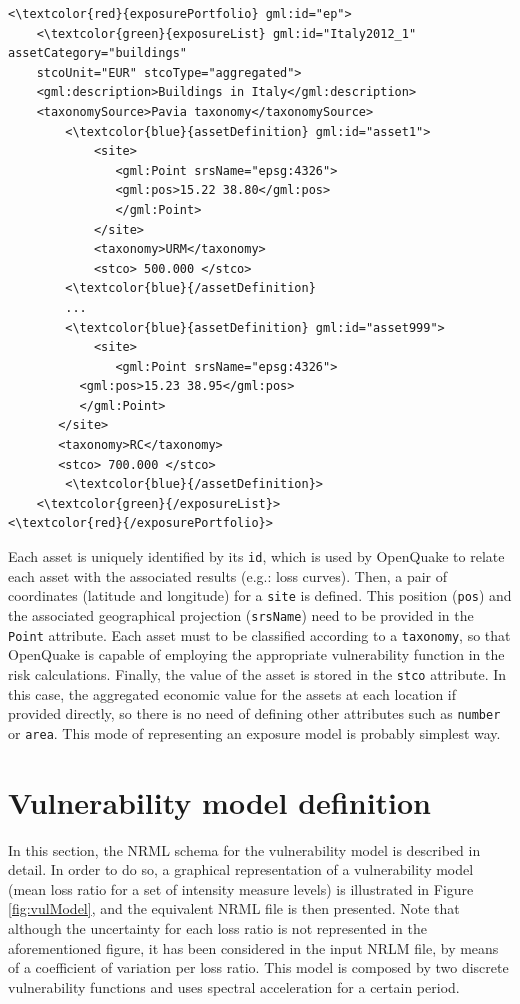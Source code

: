 \begin{Verbatim}[frame=single, commandchars=\\\{\}, samepage=false]
<\textcolor{red}{exposurePortfolio} gml:id="ep">
    <\textcolor{green}{exposureList} gml:id="Italy2012_1" assetCategory="buildings" 
    stcoUnit="EUR" stcoType="aggregated">
    <gml:description>Buildings in Italy</gml:description>
    <taxonomySource>Pavia taxonomy</taxonomySource>
        <\textcolor{blue}{assetDefinition} gml:id="asset1">
            <site>
               <gml:Point srsName="epsg:4326">
               <gml:pos>15.22 38.80</gml:pos>
               </gml:Point>
            </site>
            <taxonomy>URM</taxonomy>
            <stco> 500.000 </stco>
        <\textcolor{blue}{/assetDefinition} 
        ...
        <\textcolor{blue}{assetDefinition} gml:id="asset999">
            <site>
               <gml:Point srsName="epsg:4326">
	      <gml:pos>15.23 38.95</gml:pos>
	      </gml:Point>
	   </site>
	   <taxonomy>RC</taxonomy>
	   <stco> 700.000 </stco>
        <\textcolor{blue}{/assetDefinition}> 
    <\textcolor{green}{/exposureList}>
<\textcolor{red}{/exposurePortfolio}>
\end{Verbatim}

Each asset is uniquely identified by its \Verb+id+, which is used by OpenQuake to relate each asset with the associated results (e.g.: loss curves). Then, a pair of coordinates (latitude and longitude) for a \Verb+site+ is defined. This position (\Verb+pos+) and the associated geographical projection (\Verb+srsName+) need to be provided in the \Verb+Point+ attribute. Each asset must to be classified according to a \Verb+taxonomy+, so that OpenQuake is capable of employing the appropriate vulnerability function in the risk calculations. Finally, the value of the asset is stored in the \Verb+stco+ attribute. In this case, the aggregated economic value for the assets at each location if provided directly, so there is no need of defining other attributes such as \Verb+number+ or \Verb+area+. This mode of representing an exposure model is probably simplest way.\\ 

\section{Vulnerability model definition}
In this section, the NRML schema for the vulnerability model is described in detail. In order to do so, a graphical representation of a vulnerability model (mean loss ratio for a set of intensity measure levels) is illustrated in Figure \ref{fig:vulModel}, and the equivalent NRML file is then presented. Note that although the uncertainty for each loss ratio is not represented in the aforementioned figure, it has been considered in the input NRLM file, by means of a coefficient of variation per loss ratio. This model is composed by two discrete vulnerability functions and uses spectral acceleration for a certain period. 

